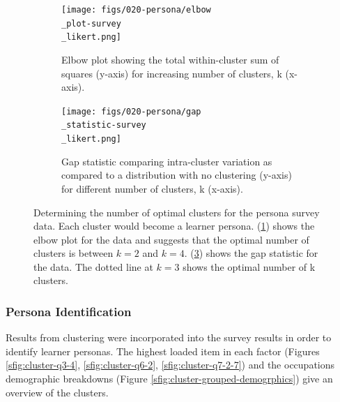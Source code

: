 \documentclass[020-persona\_validation.tex]{subfiles}
\begin{document}
        \begin{figure}[htb]
            \centering
            \begin{subfigure}[h]{0.45\textwidth}
                \centering
                \texttt{[image: figs/020-persona/elbow\\\_plot-survey\\\_likert.png]}
                \caption[Elbow plot for determining optimal number of clusters.]
                {Elbow plot showing the total within-cluster sum of squares (y-axis) for increasing number of clusters, k (x-axis).
                }
                \label{sfig:cluster-elbow}
            \end{subfigure}
            \begin{subfigure}[h]{0.45\textwidth}
                \centering
                \texttt{[image: figs/020-persona/gap\\\_statistic-survey\\\_likert.png]}
                \caption[Gap statistic for determining optimal number of clusters.]
                {Gap statistic comparing
                    intra-cluster variation as compared to a distribution with no clustering (y-axis)
                    for different number of clusters, k (x-axis).
                }
                \label{sfig:cluster-gap}
            \end{subfigure}
            \caption[Elbow plot and Gap statistic for optimal number of clusters.]
            {Determining the number of optimal clusters for the persona survey data.
                Each cluster would become a learner persona.
                (\ref{sfig:cluster-elbow}) shows the elbow plot for the data and
                suggests that the optimal number of clusters is between $k=2$ and $k=4$.
                (\ref{sfig:cluster-gap}) shows the gap statistic for the data.
                The dotted line at $k=3$ shows the optimal number of k clusters.
            }
        \end{figure}

    \subsubsection{Persona Identification}

        Results from clustering were incorporated into the survey results in order to identify learner personas.
        The highest loaded item in each factor
        (Figures \ref{sfig:cluster-q3-4}, \ref{sfig:cluster-q6-2}, \ref{sfig:cluster-q7-2-7})
        and the occupations demographic breakdowns
        (Figure \ref{sfig:cluster-grouped-demogrphics})
        give an overview of the clusters.
\end{document}
